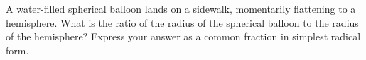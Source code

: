 A water-filled spherical balloon lands on a sidewalk, momentarily flattening to a hemisphere. What is the ratio of the radius of the spherical balloon to the radius of the hemisphere? Express your answer as a common fraction in simplest radical form.
